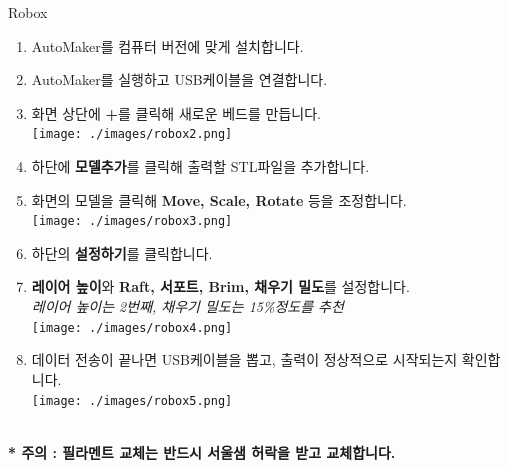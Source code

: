 \documentclass[a0paper,portrait]{baposter}
\begin{document}
\begin{poster}
\begin{posterbox}[name=robox,column=0,below=caution,above=bottom]{Robox}
\begin{enumerate}
  \item \small AutoMaker를 컴퓨터 버전에 맞게 설치합니다.
  \item AutoMaker를 실행하고 USB케이블을 연결합니다.
  \item 화면 상단에 \textbf{+}를 클릭해 새로운 베드를 만듭니다. \\
  \texttt{[image: ./images/robox2.png]}
  \item 하단에 \textbf{모델추가}를 클릭해 출력할 STL파일을 추가합니다.
  \item 화면의 모델을 클릭해 \textbf{Move, Scale, Rotate} 등을 조정합니다. \\
  \texttt{[image: ./images/robox3.png]}
  \item 하단의 \textbf{설정하기}를 클릭합니다.
  \item \textbf{레이어 높이}와 \textbf{Raft, 서포트, Brim, 채우기 밀도}를 설정합니다.\\
  \footnotesize \textit{레이어 높이는 2번째, 채우기 밀도는 15\%정도를 추천} \\
  \texttt{[image: ./images/robox4.png]}
  \item \small 데이터 전송이 끝나면 USB케이블을 뽑고, 출력이 정상적으로 시작되는지 확인합니다. \\
  \texttt{[image: ./images/robox5.png]}
\end{enumerate}
\textbf{ \\ * 주의 : 필라멘트 교체는 반드시 서울샘 허락을 받고 교체합니다.}
\end{posterbox}



\end{poster}
\end{document}
